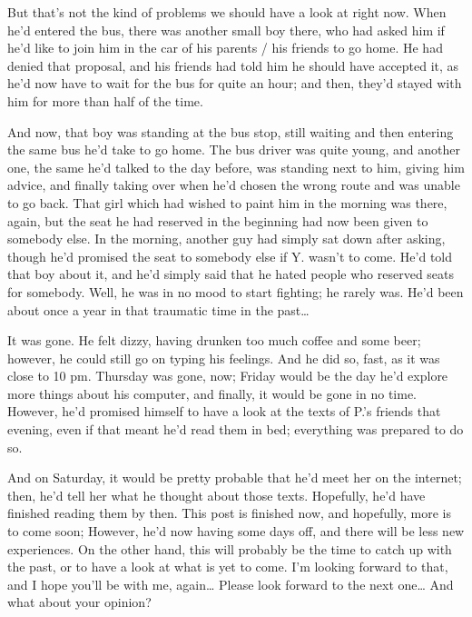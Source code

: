 But that's not the kind of problems we should have a look at right now. When he'd entered the bus, there was another small boy there, who had asked him if he'd like to join him in the car of his parents / his friends to go home. He had denied that proposal, and his friends had told him he should have accepted it, as he'd now have to wait for the bus for quite an hour; and then, they'd stayed with him for more than half of the time.

And now, that boy was standing at the bus stop, still waiting and then entering the same bus he'd take to go home. The bus driver was quite young, and another one, the same he'd talked to the day before, was standing next to him, giving him advice, and finally taking over when he'd chosen the wrong route and was unable to go back. That girl which had wished to paint him in the morning was there, again, but the seat he had reserved in the beginning had now been given to somebody else. In the morning, another guy had simply sat down after asking, though he'd promised the seat to somebody else if Y. wasn't to come. He'd told that boy about it, and he'd simply said that he hated people who reserved seats for somebody. Well, he was in no mood to start fighting; he rarely was. 
He'd been about once a year in that traumatic time in the past\ldots

It was gone. He felt dizzy, having drunken too much coffee and some beer; however, he could still go on typing his feelings. And he did so, fast, as it was close to 10 pm. 
Thursday was gone, now; Friday would be the day he'd explore more things about his computer, and finally, it would be gone in no time. However, he'd promised himself to have a look at the texts of P.'s friends that evening, even if that meant he'd read them in bed; everything was prepared to do so.

And on Saturday, it would be pretty probable that he'd meet her on the internet; then, he'd tell her what he thought about those texts. 
Hopefully, he'd have finished reading them by then. 
This post is finished now, and hopefully, more is to come soon; However, he'd now having some days off, and there will be less new experiences. On the other hand, this will probably be the time to catch up with the past, or to have a look at what is yet to come. 
I'm looking forward to that, and I hope you'll be with me, again\ldots
Please look forward to the next one\ldots
And what about your opinion?


